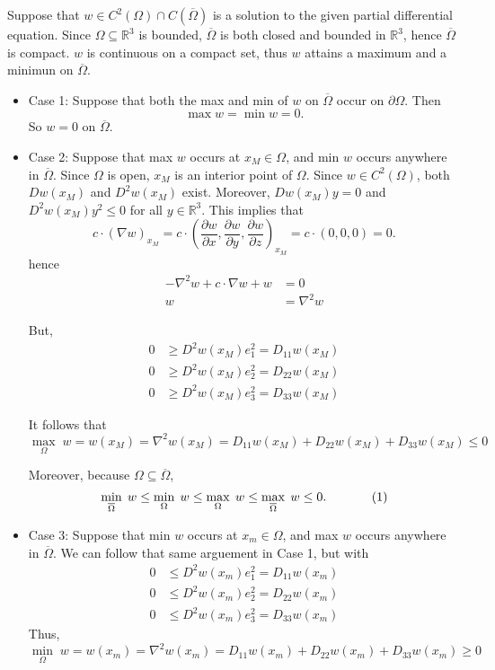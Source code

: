 \documentclass[11pt]{article}
\begin{document}
\vspace{.5in}

\noindent {\bf [4]} Suppose that $w\in C^2(\Omega)\cap C(\overline{\Omega})$ is a solution to the given partial differential equation. Since $\Omega\subseteq\mathbb{R}^3$ is bounded,  $\overline{\Omega}$ is both closed and bounded in $\mathbb{R}^3$, hence $\overline{\Omega}$ is compact. $w$ is continuous on a compact set, thus $w$ attains a maximum and a minimun on $\overline{\Omega}$.

\begin{itemize}
\item Case 1: Suppose that both the max and min of $w$ on $\overline{\Omega}$ occur on $\partial \Omega$. Then 
\[
\max w=\min w=0.
\]
\noindent So $w=0$ on $\overline{\Omega}$.

\item Case 2: Suppose that max $w$ occurs at $x_M\in \Omega$, and min $w$ occurs anywhere in $\overline{\Omega}$. Since $\Omega$ is open, $x_M$ is an interior point of $\Omega$. Since $w\in C^2(\Omega)$, both $Dw(x_M)$ and $D^2w(x_M)$ exist. Moreover, $Dw(x_M)y=0$ and $D^2w(x_M)y^2\leq 0$ for all $y\in \mathbb{R}^3$. This implies that 
\[
c\cdot \left(\nabla w\right)_{x_M}=c\cdot \left(\frac{\partial w}{\partial x},\frac{\partial w}{\partial y},\frac{\partial w}{\partial z}\right)_{x_M}=c\cdot \left(0,0,0\right)=0.
\]
hence
\begin{align*}
-\nabla ^2w+c\cdot \nabla w + w&=0 \\ w&=\nabla ^2w
\end{align*}

\noindent But, 
\begin{align*}
0&\geq D^2w(x_M)e_1^2=D_{11}w(x_M) \\ 0&\geq D^2w(x_M)e_2^2=D_{22}w(x_M) \\ 0&\geq D^2w(x_M)e_3^2=D_{33}w(x_M)
\end{align*}

\noindent It follows that 
\[
\max\limits_{\Omega}\;w=w(x_M)=\nabla ^2w(x_M)=D_{11}w(x_M)+D_{22}w(x_M)+D_{33}w(x_M)\leq 0
\]

\noindent Moreover, because $\Omega\subseteq \overline{\Omega}$,
\[
\min\limits_{\overline{\Omega}}\;w \leq \min\limits_{\Omega}\;w \leq \max\limits_{\Omega}\;w \leq \max\limits_{\overline{\Omega}}\;w \leq 0.\hspace{.5in}(1)
\]

\item Case 3: Suppose that min $w$ occurs at $x_m\in \Omega$, and max $w$ occurs anywhere in $\overline{\Omega}$. We can follow that same arguement in Case 1, but with
\begin{align*}
0&\leq D^2w(x_m)e_1^2=D_{11}w(x_m) \\ 0&\leq D^2w(x_m)e_2^2=D_{22}w(x_m) \\ 0&\leq D^2w(x_m)e_3^2=D_{33}w(x_m)
\end{align*}
Thus, 
\[
\min\limits_{\Omega}\;w=w(x_m)=\nabla ^2w(x_m)=D_{11}w(x_m)+D_{22}w(x_m)+D_{33}w(x_m)\geq 0
\]


\end{itemize}
\end{document}
